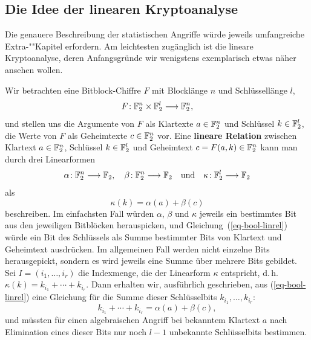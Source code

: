 \begin{refsegment}
\subsection{Die Idee der linearen Kryptoanalyse}\label{ss-bool-lka}

Die genauere Beschreibung der statistischen Angriffe würde jeweils
umfangreiche Extra-""Kapitel erfordern. Am leichtesten zugänglich
ist die lineare Kryptoanalyse,
deren Anfangsgründe wir wenigstens exemplarisch etwas näher ansehen wollen.

Wir betrachten eine Bitblock-Chiffre $F$
mit Blocklänge $n$ und Schlüssellänge $l$,
\[
   F\!: \mathbb{F}_2^n \times \mathbb{F}_2^l \longrightarrow \mathbb{F}_2^n,
\]
und stellen uns die Argumente von $F$ als Klartexte $a \in \mathbb{F}_2^n$
und Schlüssel $k \in \mathbb{F}_2^l$, die Werte von $F$ als Geheimtexte
$c \in \mathbb{F}_2^n$ vor. Eine
{\bf lineare Relation}
zwischen Klartext
$a \in \mathbb{F}_2^n$, Schlüssel $k \in \mathbb{F}_2^l$ und Geheimtext
$c = F(a,k) \in \mathbb{F}_2^n$ kann man durch drei Linearformen
\[
   \alpha\!: \mathbb{F}_2^n \longrightarrow \mathbb{F}_2, \quad
   \beta\!: \mathbb{F}_2^n  \longrightarrow \mathbb{F}_2 \quad \text{und}
   \quad \kappa\!: \mathbb{F}_2^l \longrightarrow \mathbb{F}_2
\]
als
\begin{equation}\label{eq-bool-linrel}
   \kappa(k) = \alpha(a) + \beta(c)
\end{equation}
beschreiben. Im einfachsten Fall würden $\alpha$, $\beta$ und $\kappa$
jeweils ein bestimmtes Bit aus den jeweiligen Bitblöcken herauspicken, und
Gleichung~(\ref{eq-bool-linrel}) würde ein Bit des Schlüssels als Summe
bestimmter Bits von Klartext und Geheimtext ausdrücken. Im allgemeinen
Fall werden nicht einzelne Bits herausgepickt, sondern es wird jeweils
eine Summe über mehrere Bits gebildet. Sei $I = (i_1, \ldots, i_r)$ die
Indexmenge, die der Linearform $\kappa$ entspricht, d.\,h.
$\kappa(k) = k_{i_1} +  \cdots + k_{i_r}$. Dann erhalten wir,
ausführlich geschrieben, aus (\ref{eq-bool-linrel})
eine Gleichung für die Summe dieser Schlüsselbits $k_{i_1}, \ldots, k_{i_r}$:
\[
     k_{i_1} + \cdots + k_{i_r} = \alpha(a) + \beta(c),
\]
und müssten für einen algebraischen
Angriff bei
bekanntem Klartext
$a$ nach Elimination eines dieser
Bits nur noch $l-1$ unbekannte Schlüsselbits bestimmen.


\end{refsegment}
